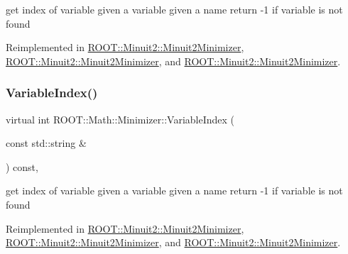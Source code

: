 get index of variable given a variable given a name return -\/1 if variable is not found 

Reimplemented in \mbox{\hyperlink{classROOT_1_1Minuit2_1_1Minuit2Minimizer_a93839e851d16fff50898af2159d8863d}{R\+O\+O\+T\+::\+Minuit2\+::\+Minuit2\+Minimizer}}, \mbox{\hyperlink{classROOT_1_1Minuit2_1_1Minuit2Minimizer_a93839e851d16fff50898af2159d8863d}{R\+O\+O\+T\+::\+Minuit2\+::\+Minuit2\+Minimizer}}, and \mbox{\hyperlink{classROOT_1_1Minuit2_1_1Minuit2Minimizer_a93839e851d16fff50898af2159d8863d}{R\+O\+O\+T\+::\+Minuit2\+::\+Minuit2\+Minimizer}}.

\mbox{\label{classROOT_1_1Math_1_1Minimizer_a5f7ff3bdda1f4b1d9e5e1150091a86c5}} 
\subsubsection{\texorpdfstring{VariableIndex()}{VariableIndex()}\hspace{0.1cm}{\footnotesize\ttfamily [2/3]}}
{\footnotesize\ttfamily virtual int R\+O\+O\+T\+::\+Math\+::\+Minimizer\+::\+Variable\+Index (\begin{DoxyParamCaption}\item[{const std\+::string \&}]{ }\end{DoxyParamCaption}) const\hspace{0.3cm}{\ttfamily [inline]}, {\ttfamily [virtual]}}

get index of variable given a variable given a name return -\/1 if variable is not found 

Reimplemented in \mbox{\hyperlink{classROOT_1_1Minuit2_1_1Minuit2Minimizer_a93839e851d16fff50898af2159d8863d}{R\+O\+O\+T\+::\+Minuit2\+::\+Minuit2\+Minimizer}}, \mbox{\hyperlink{classROOT_1_1Minuit2_1_1Minuit2Minimizer_a93839e851d16fff50898af2159d8863d}{R\+O\+O\+T\+::\+Minuit2\+::\+Minuit2\+Minimizer}}, and \mbox{\hyperlink{classROOT_1_1Minuit2_1_1Minuit2Minimizer_a93839e851d16fff50898af2159d8863d}{R\+O\+O\+T\+::\+Minuit2\+::\+Minuit2\+Minimizer}}.

\mbox{\label{classROOT_1_1Math_1_1Minimizer_a5f7ff3bdda1f4b1d9e5e1150091a86c5}} 
